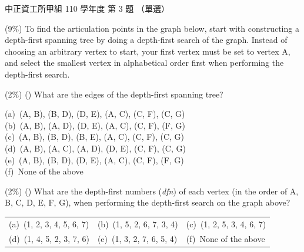 \begin{pastexam}[label={px:ccu-110-swa-01}]{中正資工所甲組 110 學年度 第 3 題}
（單選）

(9\%) To find the articulation points in the graph below, start with constructing a
depth-first spanning tree by doing a depth-first search of the graph. Instead of choosing an
arbitrary vertex to start, your first vertex must be set to vertex A, and select the smallest
vertex in alphabetical order first when performing the depth-first search.

\begin{center}
\end{center}

 (2\%) (\quad) What are the edges of the depth-first spanning tree?

(a)~(A, B), (B, D), (D, E), (A, C), (C, F), (C, G)\\
(b)~(A, B), (A, D), (D, E), (A, C), (C, F), (F, G)\\
(c)~(A, B), (B, D), (B, E), (A, C), (C, F), (C, G)\\
(d)~(A, B), (A, C), (A, D), (D, E), (C, F), (C, G)\\
(e)~(A, B), (B, D), (D, E), (A, C), (C, F), (F, G)\\
(f)~None of the above

 (2\%) (\quad) What are the depth-first numbers (\textit{dfn}) of each vertex (in the order
of A, B, C, D, E, F, G), when performing the depth-first search on the graph above?

\begin{tabular}{@{}lll@{}}
(a)~(1, 2, 3, 4, 5, 6, 7) & (b)~(1, 5, 2, 6, 7, 3, 4) & (c)~(1, 2, 5, 3, 4, 6, 7) \\
(d)~(1, 4, 5, 2, 3, 7, 6) & (e)~(1, 3, 2, 7, 6, 5, 4) & (f)~None of the above
\end{tabular}


\end{pastexam}
